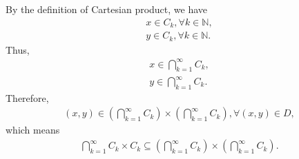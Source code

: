 \documentclass[UTF8,a4paper,10pt]{article}
\begin{document}
\begin{solution}
    By the definition of Cartesian product, we have
    \begin{equation*}
      \begin{aligned}
        x\in C_k, \forall k \in \mathbb{N},\\
        y\in C_k, \forall k \in \mathbb{N}.
      \end{aligned}
    \end{equation*}
    Thus,
    \begin{equation*}
      \begin{aligned}
        x\in \bigcap_{k=1}^{\infty} C_k,\\
        y\in \bigcap_{k=1}^{\infty} C_k.
      \end{aligned}
    \end{equation*}
    Therefore,
    \begin{equation*}
      \begin{aligned}
        (x,y)\in \left(\bigcap_{k=1}^{\infty} C_k\right) \times \left(\bigcap_{k=1}^{\infty} C_k\right),\forall (x,y)\in D,
      \end{aligned}
    \end{equation*}
    which means
    \begin{equation*}
      \begin{aligned}
        \bigcap_{k=1}^{\infty} C_k \times C_k \subseteq  \left(\bigcap_{k=1}^{\infty} C_k\right) \times \left(\bigcap_{k=1}^{\infty} C_k\right).
      \end{aligned}
    \end{equation*}



\end{solution}
\end{document}

